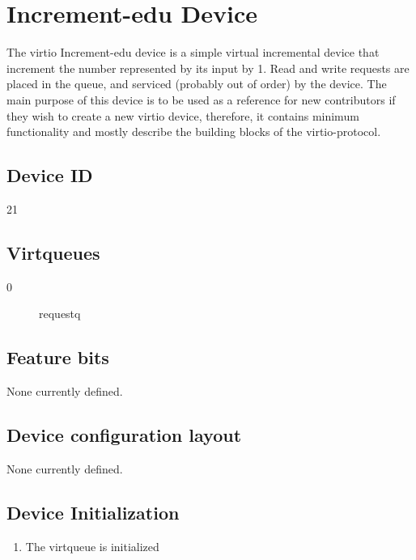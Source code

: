 \section{Increment-edu Device}\label{sec:Device Types / Increment-edu Device}

The virtio Increment-edu device is a simple virtual incremental device that
increment the number represented by its input by 1.
Read and write requests are placed in the queue, and serviced
(probably out of order) by the device.
The main purpose of this device is to be used as a reference for new contributors
if they wish to create a new virtio device, therefore, it contains minimum
functionality and mostly describe the building blocks of the virtio-protocol.

\subsection{Device ID}\label{sec:Device Types / Increment-edu Device / Device ID}
  21

\subsection{Virtqueues}\label{sec:Device Types / Increment-edu Device / Virtqueues}
\begin{description}
\item[0] requestq
\end{description}

\subsection{Feature bits}\label{sec:Device Types / Increment-edu Device / Feature bits}

None currently defined.

\subsection{Device configuration layout}\label{sec:Device Types / Increment-edu Device / Device configuration layout}

None currently defined.

\subsection{Device Initialization}\label{sec:Device Types / Increment-edu Device / Device Initialization}

\begin{enumerate}
\item The virtqueue is initialized
\end{enumerate}

